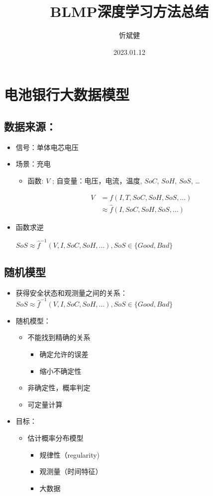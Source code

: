 \documentclass[a4paper, 11pt]{article}
\author{忻斌健}
\date{2023.01.12}
\title{BLMP深度学习方法总结}
\begin{document}
\maketitle
\setcounter{tocdepth}{1}
\tableofcontents

\section*{电池银行大数据模型}
\label{sec:org029afb7}
\subsection*{数据来源：}
\label{sec:orgc4bf967}
\begin{itemize}
\item 信号：单体电芯电压
\item 场景：充电
\begin{itemize}
\item 函数: \(V\) ; 自变量：电压，电流，温度, \(SoC\), \(SoH\), \(SoS\), \ldots{}

\begin{align*}
    V &=f(I,T,SoC,SoH,SoS,...)\\
      &\approx\hat{f}(I,SoC,SoH,SoS,...)
\end{align*}
\end{itemize}

\item 函数求逆

\(SoS \approx \hat{f}^{-1}(V,I,SoC,SoH,...), SoS \in \{Good, Bad\}\)
\end{itemize}
\subsection*{随机模型}
\label{sec:org9e63245}

\begin{itemize}
\item 获得安全状态和观测量之间的关系：\(SoS \approx \hat{f}^{-1}(V,I,SoC,SoH,...), SoS \in \{Good, Bad\}\)
\end{itemize}
\begin{itemize}
\item 随机模型：
\begin{itemize}
\item 不能找到精确的关系
\begin{itemize}
\item 确定允许的误差
\item 缩小不确定性
\end{itemize}
\item 非确定性，概率判定
\item 可定量计算
\end{itemize}
\item 目标：
\begin{itemize}
\item 估计概率分布模型
\begin{itemize}
\item 规律性（regularity)
\item 观测量（时间特征）
\item 大数据
\end{itemize}
\end{itemize}
\end{itemize}
\end{document}
